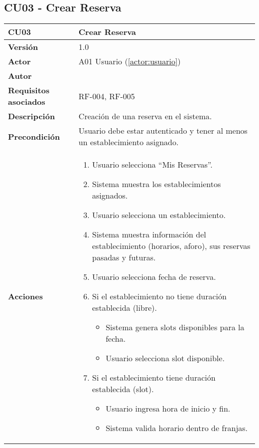 \subsection{CU03 - Crear Reserva}

\begin{table}[H]
	\centering
	\begin{tabularx}{\linewidth}{ p{} p{} }
		\toprule
		\textbf{CU03}    & \textbf{Crear Reserva} \\
		\toprule
		\textbf{Versión}              & 1.0    \\
		\textbf{Actor}                & A01 Usuario (\ref{actor:usuario}) \\
		\textbf{Autor}                & \nombre \\
		\textbf{Requisitos asociados} & RF-004, RF-005 \\
		\textbf{Descripción}          & Creación de una reserva en el sistema. \\
		\textbf{Precondición}         & Usuario debe estar autenticado y tener al menos un establecimiento asignado. \\
		\textbf{Acciones}             &
		\begin{enumerate}
			\def\labelenumi{\arabic{enumi}.}
			\tightlist
			\item Usuario selecciona ``Mis Reservas''.
            \item Sistema muestra los establecimientos asignados.
            \item Usuario selecciona un establecimiento.
            \item Sistema muestra información del establecimiento (horarios, aforo), sus reservas pasadas y futuras.
            \item Usuario selecciona fecha de reserva.
            \item Si el establecimiento no tiene duración establecida (libre).
   		\begin{itemize}
  			\item Sistema genera slots disponibles para la fecha.
			  \item Usuario selecciona slot disponible.
  		\end{itemize}
            \item Si el establecimiento tiene duración establecida (slot).
   		\begin{itemize}
  			\item Usuario ingresa hora de inicio y fin.
			  \item Sistema valida horario dentro de franjas.

\end{itemize}
\end{enumerate}
\end{tabularx}
\end{table}

